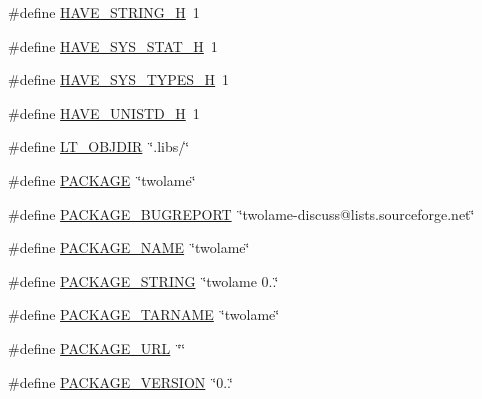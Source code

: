 \begin{DoxyCompactItemize}
\item 
\#define \hyperlink{mac_2config_2i386_2lib-src_2twolame_2libtwolame_2config_8h_ad4c234dd1625255dc626a15886306e7d}{H\+A\+V\+E\+\_\+\+S\+T\+R\+I\+N\+G\+\_\+H}~1
\item 
\#define \hyperlink{mac_2config_2i386_2lib-src_2twolame_2libtwolame_2config_8h_ace156430ba007d19b4348a950d0c692b}{H\+A\+V\+E\+\_\+\+S\+Y\+S\+\_\+\+S\+T\+A\+T\+\_\+H}~1
\item 
\#define \hyperlink{mac_2config_2i386_2lib-src_2twolame_2libtwolame_2config_8h_a69dc70bea5d1f8bd2be9740e974fa666}{H\+A\+V\+E\+\_\+\+S\+Y\+S\+\_\+\+T\+Y\+P\+E\+S\+\_\+H}~1
\item 
\#define \hyperlink{mac_2config_2i386_2lib-src_2twolame_2libtwolame_2config_8h_a219b06937831d0da94d801ab13987639}{H\+A\+V\+E\+\_\+\+U\+N\+I\+S\+T\+D\+\_\+H}~1
\item 
\#define \hyperlink{mac_2config_2i386_2lib-src_2twolame_2libtwolame_2config_8h_ac2d5925d76379847dd9fc4747b061659}{L\+T\+\_\+\+O\+B\+J\+D\+IR}~\char`\"{}.libs/\char`\"{}
\item 
\#define \hyperlink{mac_2config_2i386_2lib-src_2twolame_2libtwolame_2config_8h_aca8570fb706c81df371b7f9bc454ae03}{P\+A\+C\+K\+A\+GE}~\char`\"{}twolame\char`\"{}
\item 
\#define \hyperlink{mac_2config_2i386_2lib-src_2twolame_2libtwolame_2config_8h_a1d1d2d7f8d2f95b376954d649ab03233}{P\+A\+C\+K\+A\+G\+E\+\_\+\+B\+U\+G\+R\+E\+P\+O\+RT}~\char`\"{}twolame-\/discuss@lists.\+sourceforge.\+net\char`\"{}
\item 
\#define \hyperlink{mac_2config_2i386_2lib-src_2twolame_2libtwolame_2config_8h_a1c0439e4355794c09b64274849eb0279}{P\+A\+C\+K\+A\+G\+E\+\_\+\+N\+A\+ME}~\char`\"{}twolame\char`\"{}
\item 
\#define \hyperlink{mac_2config_2i386_2lib-src_2twolame_2libtwolame_2config_8h_ac73e6f903c16eca7710f92e36e1c6fbf}{P\+A\+C\+K\+A\+G\+E\+\_\+\+S\+T\+R\+I\+NG}~\char`\"{}twolame 0..\char`\"{}
\item 
\#define \hyperlink{mac_2config_2i386_2lib-src_2twolame_2libtwolame_2config_8h_af415af6bfede0e8d5453708afe68651c}{P\+A\+C\+K\+A\+G\+E\+\_\+\+T\+A\+R\+N\+A\+ME}~\char`\"{}twolame\char`\"{}
\item 
\#define \hyperlink{mac_2config_2i386_2lib-src_2twolame_2libtwolame_2config_8h_a5c93853116d5a50307b6744f147840aa}{P\+A\+C\+K\+A\+G\+E\+\_\+\+U\+RL}~\char`\"{}\char`\"{}
\item 
\#define \hyperlink{mac_2config_2i386_2lib-src_2twolame_2libtwolame_2config_8h_aa326a05d5e30f9e9a4bb0b4469d5d0c0}{P\+A\+C\+K\+A\+G\+E\+\_\+\+V\+E\+R\+S\+I\+ON}~\char`\"{}0..\char`\"{}

\end{DoxyCompactItemize}
